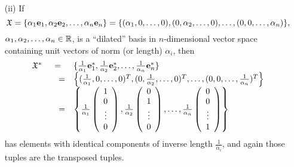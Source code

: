 {\begin{itemize}
\item[(ii)]
If $$
{\frak X}=\{\alpha_1 {\bf e}_1, \alpha_2 {\bf e}_2,\ldots ,\alpha_n {\bf e}_n\}
=\{
(\alpha_1 ,0,\ldots,0),
(0,\alpha_2 ,\ldots,0),
\ldots,
(0,0,\ldots,\alpha_n )\},$$  $\alpha_1,\alpha_2,\ldots ,\alpha_n \in {\Bbb R}$,
is a ``dilated'' basis in $n$-dimensional vector space containing unit vectors of norm (or length) $\alpha_i$,
then
$$
\begin{array}{rcl}
{\frak X}^*
&=&\{\frac{1}{\alpha_1 }{\bf e}_1^* ,\frac{1}{\alpha_2 }{\bf e}_2^*, \ldots ,\frac{1}{\alpha_n }{\bf e}_n^* \}\\
&\quad =&\left\{
(\frac{1}{\alpha_1 },0,\ldots,0)^T,
(0,\frac{1}{\alpha_2 },\ldots,0)^T,
\ldots,
(0,0,\ldots,\frac{1}{\alpha_n })^T\right\}  \\
&\quad =&  \left\{
\frac{1}{\alpha_1 }\left(
\begin{array}{c}
1\\
0\\
\vdots \\
0
\end{array}
\right),
\frac{1}{\alpha_2 }
\left(
\begin{array}{c}
0\\
1\\
\vdots \\
0
\end{array}
\right),
\ldots ,
\frac{1}{\alpha_n }
\left(
\begin{array}{c}
0\\
0\\
\vdots \\
1
\end{array}
\right)
\right\}
\end{array}
$$
has elements with identical components of inverse length $\frac{1}{\alpha_i }$,
and again those tuples are the transposed tuples.


\end{itemize}}
